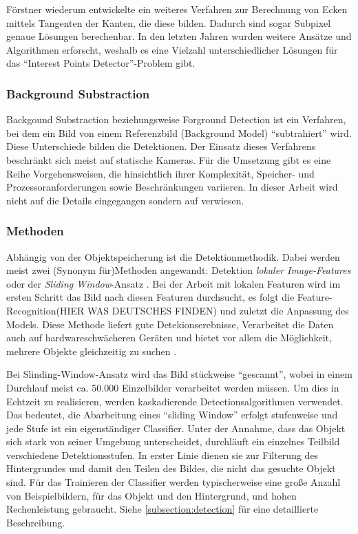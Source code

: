 Förstner \cite{FOD} wiederum entwickelte ein weiteres Verfahren zur Berechnung von Ecken mittels Tangenten der Kanten, die diese bilden. Dadurch sind sogar Subpixel genaue Lösungen berechenbar. In den letzten Jahren wurden weitere Ansätze und Algorithmen erforscht, weshalb es eine Vielzahl unterschiedlicher Lösungen für das ``Interest Points Detector''-Problem gibt.

\subsubsection{Background Substraction}
Backgound Substraction beziehungsweise Forground Detection ist ein Verfahren, bei dem ein Bild von einem Referenzbild (Background Model) ``subtrahiert'' wird. Diese Unterschiede bilden die Detektionen. Der Einsatz dieses Verfahrens beschränkt sich meist auf statische Kameras. Für die Umsetzung gibt es eine Reihe Vorgehensweisen, die hinsichtlich ihrer Komplexität, Speicher- und Prozessoranforderungen sowie Beschränkungen variieren. In dieser Arbeit wird nicht auf die Details eingegangen sondern auf \cite{BAG} verwiesen.

\subsubsection{Methoden}
Abhängig von der Objektspeicherung ist die Detektionmethodik. Dabei werden meist zwei (Synonym für)Methoden angewandt: Detektion \textit{lokaler Image-Features}\cite{IMF} oder der \textit{Sliding Window}-Ansatz \cite{IIM}.
Bei der Arbeit mit lokalen Featuren wird im ersten Schritt das Bild nach diesen Featuren durchsucht, es folgt die Feature-Recognition(HIER WAS DEUTSCHES FINDEN) und zuletzt die Anpassung des Models. Diese Methode liefert gute Detekionserebnisse, Verarbeitet die Daten auch auf hardwareschwächeren Geräten und bietet vor allem die Möglichkeit, mehrere Objekte gleichzeitig zu suchen\cite{MTL} \cite{VAH} \cite{SLI}.

Bei Slinding-Window-Ansatz wird das Bild stückweise ``gescannt'', wobei in einem Durchlauf meist ca. 50.000 Einzelbilder verarbeitet werden müssen. Um dies in Echtzeit zu realisieren, werden kaskadierende Detectionsalgorithmen verwendet. Das bedeutet, die Abarbeitung eines ``sliding Window'' erfolgt stufenweise und jede Stufe ist ein eigenständiger Classifier. Unter der Annahme, dass das Objekt sich stark von seiner Umgebung unterscheidet, durchläuft ein einzelnes Teilbild verschiedene Detektionsstufen. In erster Linie dienen sie zur Filterung des Hintergrundes und damit den Teilen des Bildes, die nicht das gesuchte Objekt sind. Für das Trainieren der Classifier werden typischerweise eine große Anzahl von Beispielbildern, für das Objekt und den Hintergrund, und hohen Rechenleistung gebraucht. Siehe \ref{subsection:detection} für eine detaillierte Beschreibung.


